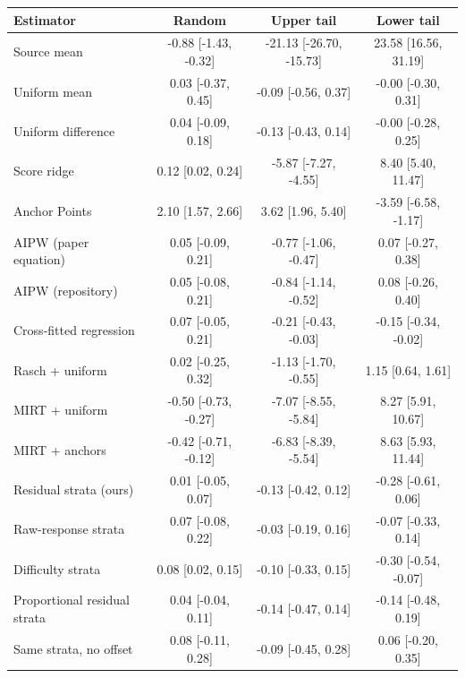 \begin{tabular}{lccc}
\toprule
Estimator & Random & Upper tail & Lower tail \\
\midrule
Source mean & -0.88 [-1.43, -0.32] & -21.13 [-26.70, -15.73] & 23.58 [16.56, 31.19] \\
Uniform mean & 0.03 [-0.37, 0.45] & -0.09 [-0.56, 0.37] & -0.00 [-0.30, 0.31] \\
Uniform difference & 0.04 [-0.09, 0.18] & -0.13 [-0.43, 0.14] & -0.00 [-0.28, 0.25] \\
Score ridge & 0.12 [0.02, 0.24] & -5.87 [-7.27, -4.55] & 8.40 [5.40, 11.47] \\
Anchor Points & 2.10 [1.57, 2.66] & 3.62 [1.96, 5.40] & -3.59 [-6.58, -1.17] \\
AIPW (paper equation) & 0.05 [-0.09, 0.21] & -0.77 [-1.06, -0.47] & 0.07 [-0.27, 0.38] \\
AIPW (repository) & 0.05 [-0.08, 0.21] & -0.84 [-1.14, -0.52] & 0.08 [-0.26, 0.40] \\
Cross-fitted regression & 0.07 [-0.05, 0.21] & -0.21 [-0.43, -0.03] & -0.15 [-0.34, -0.02] \\
Rasch + uniform & 0.02 [-0.25, 0.32] & -1.13 [-1.70, -0.55] & 1.15 [0.64, 1.61] \\
MIRT + uniform & -0.50 [-0.73, -0.27] & -7.07 [-8.55, -5.84] & 8.27 [5.91, 10.67] \\
MIRT + anchors & -0.42 [-0.71, -0.12] & -6.83 [-8.39, -5.54] & 8.63 [5.93, 11.44] \\
Residual strata (ours) & 0.01 [-0.05, 0.07] & -0.13 [-0.42, 0.12] & -0.28 [-0.61, 0.06] \\
Raw-response strata & 0.07 [-0.08, 0.22] & -0.03 [-0.19, 0.16] & -0.07 [-0.33, 0.14] \\
Difficulty strata & 0.08 [0.02, 0.15] & -0.10 [-0.33, 0.15] & -0.30 [-0.54, -0.07] \\
Proportional residual strata & 0.04 [-0.04, 0.11] & -0.14 [-0.47, 0.14] & -0.14 [-0.48, 0.19] \\
Same strata, no offset & 0.08 [-0.11, 0.28] & -0.09 [-0.45, 0.28] & 0.06 [-0.20, 0.35] \\
\bottomrule
\end{tabular}
